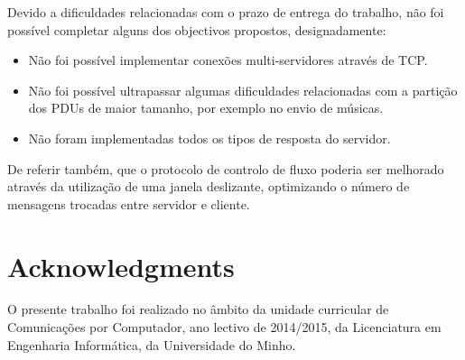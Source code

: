 \documentclass{llncs}
\begin{document}
Devido a dificuldades relacionadas com o prazo de entrega do trabalho, não foi possível 
completar alguns dos objectivos propostos, designadamente:
\begin{itemize}
\item Não foi possível implementar conexões multi-servidores através de TCP.
\item Não foi possível ultrapassar algumas dificuldades relacionadas com a 
	partição dos PDUs de maior tamanho, por exemplo no envio de músicas.
\item Não foram implementadas todos os tipos de resposta do servidor.
\end{itemize}

De referir também, que o protocolo de controlo de fluxo poderia ser melhorado através da 
utilização de uma janela deslizante, optimizando o número de mensagens trocadas entre 
servidor e cliente.

\section*{Acknowledgments}
O presente trabalho foi realizado no âmbito da unidade curricular de Comunicações por Computador, 
ano lectivo de 2014/2015, da Licenciatura em Engenharia Informática, da Universidade do Minho.



\end{document}
